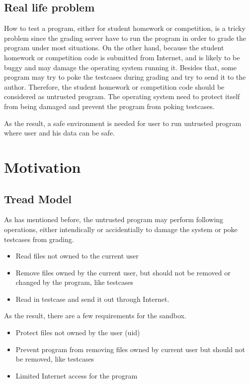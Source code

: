 \documentclass[conference,compsoc]{IEEEtran}
\begin{document}
	\subsection{Real life problem}
		\par
			How to test a program, either for student homework or competition, is a tricky problem since the grading server have to run the program in order to grade the program under most situations. 
			On the other hand, because the student homework or competition code is submitted from Internet, and is likely to be buggy and may damage the operating system running it. 
			Besides that, some program may try to poke the testcases during grading and try to send it to the author.
			Therefore, the student homework or competition code should be considered as untrusted program. 
			The operating system need to protect itself from being damaged and prevent the program from poking testcases.
		\par
			As the result, a safe environment is needed for user to run untrusted program where user and his data can be safe. 
\section {Motivation}
	\subsection{Tread Model}
		\par
			As has mentioned before, the untrusted program may perform following operations, either intendically or accidentially to damage the system or poke testcases from grading.
			\begin{itemize}
				\item {Read files not owned to the current user}
				\item {Remove files owned by the current user, but should not be removed or changed by the program, like testcases}
				\item {Read in testcase and send it out through Internet.}
			\end{itemize}
		\par
			As the result, there are a few requirements for the sandbox.
			\begin{itemize}
				\item {Protect files not owned by the user (uid)}
				\item {Prevent program from removing files owned by current user but should not be removed, like testcases}
				\item {Limited Internet access for the program}
			\end{itemize}
\end{document}

